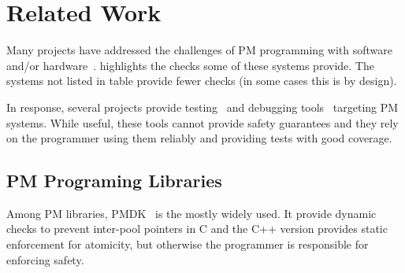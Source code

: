 \section{Related Work}
\label{sec:related}



Many projects have addressed the challenges of PM programming with
software~\cite{pmdk,pronto,mnemosyne,nvheaps,atlas,oracle-nvm-direct,ido,usnap,cohen2018object,
  autopersist,janus,libpm,lazypersist,pisces} and/or
hardware~\cite{ogleari2018steal,Kiln,jeong2018efficient,xu2020hardware}.
 highlights the checks some of these systems provide.  The systems not listed in table
provide fewer checks (in some cases this is by design).

In response, several projects provide
testing~\cite{pmtest,oukid2016testing,xfdetector} and debugging
tools~\cite{intel-pmemcheck,intel-inspector,lantz2014yat} targeting PM systems.
While useful, these tools cannot provide safety guarantees and they rely on the
programmer using them reliably and providing tests with good coverage.

\subsection{PM Programing Libraries}

Among PM libraries, PMDK~\cite{pmdk} is the mostly widely used.  It provide dynamic checks to prevent inter-pool pointers in C and the C++ version provides static enforcement for atomicity, but otherwise the programmer is responsible for enforcing safety.

